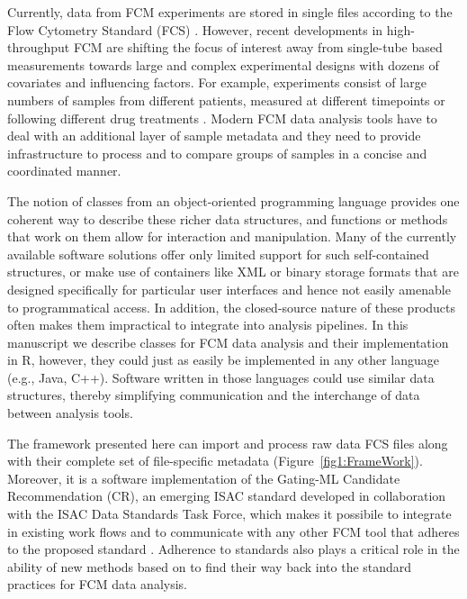 \documentclass[10pt]{bmc_article}
\newenvironment{bmcformat}{\begin{raggedright}\baselineskip20pt\sloppy\setboolean{publ}{false}}{\end{raggedright}\baselineskip20pt\sloppy}
\begin{document}
\begin{bmcformat}
Currently, data from FCM experiments are stored in single files
according to the Flow Cytometry Standard (FCS) \citep{seamer1997pnd}.
However, recent developments in high-throughput FCM are shifting the
focus of interest away from single-tube based measurements towards
large and complex experimental designs with dozens of covariates and
influencing factors. For example, experiments consist of large numbers
of samples from different patients, measured at different timepoints
\citep{brinkman2007hcf} or following different drug treatments
\citep{gasparetto2004ice}. Modern FCM data analysis tools have to deal
with an additional layer of sample metadata and they need to provide
infrastructure to process and to compare groups of samples in a
concise and coordinated manner.

The notion of classes from an object-oriented programming language
provides one coherent way to describe these richer data structures,
and functions or methods that work on them allow for interaction and
manipulation. Many of the currently available software solutions offer
only limited support for such self-contained structures, or make use
of containers like XML or binary storage formats that are designed
specifically for particular user interfaces and hence not easily
amenable to programmatical access. In addition, the closed-source
nature of these products often makes them impractical to integrate
into analysis pipelines. In this manuscript we describe classes for
FCM data analysis and their implementation in R, however, they could
just as easily be implemented in any other language (e.g., Java,
C++). Software written in those languages could use similar data
structures, thereby simplifying communication and the interchange of
data between analysis tools.

The  framework presented here can import and
process raw data FCS files along with their complete set of
file-specific metadata (Figure~\ref{fig1:FrameWork}).  Moreover, it is
a software implementation of the Gating-ML Candidate Recommendation
(CR), an emerging ISAC standard developed in collaboration with the
ISAC Data Standards Task Force, which makes it possibile to integrate
 in existing work flows and to communicate with any
other FCM tool that adheres to the proposed standard
\citep{SpidlenInPressCytometryA}. Adherence to standards also plays a
critical role in the ability of new methods based on
 to find their way back into the standard practices
for FCM data analysis.


\end{bmcformat}
\end{document}
